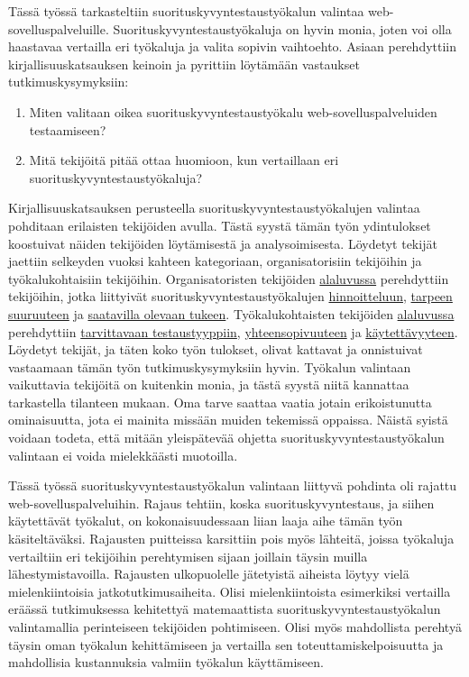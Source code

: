 Tässä työssä tarkasteltiin suorituskyvyntestaustyökalun valintaa web-sovelluspalveluille. Suorituskyvyntestaustyökaluja on hyvin monia, joten voi olla haastavaa vertailla eri työkaluja ja valita sopivin vaihtoehto. Asiaan perehdyttiin kirjallisuuskatsauksen keinoin ja pyrittiin löytämään vastaukset tutkimuskysymyksiin: 

\begin{enumerate}
    \item Miten valitaan oikea suorituskyvyntestaustyökalu web-sovelluspalveluiden testaamiseen?
    \item Mitä tekijöitä pitää ottaa huomioon, kun vertaillaan eri suorituskyvyntestaustyökaluja?
\end{enumerate}

Kirjallisuuskatsauksen perusteella suorituskyvyntestaustyökalujen valintaa pohditaan erilaisten tekijöiden avulla. Tästä syystä tämän työn ydintulokset koostuivat näiden tekijöiden löytämisestä ja analysoimisesta. Löydetyt tekijät jaettiin selkeyden vuoksi kahteen kategoriaan, organisatorisiin tekijöihin ja työkalukohtaisiin tekijöihin. Organisatoristen tekijöiden \hyperref[sec:organisatorisettekijät]{alaluvussa} perehdyttiin tekijöihin, jotka liittyivät suorituskyvyntestaustyökalujen \hyperref[ssec:hinta]{hinnoitteluun}, \hyperref[ssec:tarpeensuuruus]{tarpeen suuruuteen} ja \hyperref[ssec:tuki]{saatavilla olevaan tukeen}. Työkalukohtaisten tekijöiden \hyperref[sec:työkalukohtaisettekijät]{alaluvussa} perehdyttiin \hyperref[ssec:tarvittavatestaustyyppi]{tarvittavaan testaustyyppiin}, \hyperref[ssec:yhteensopivuus]{yhteensopivuuteen} ja \hyperref[ssec:käytettävyys]{käytettävyyteen}. Löydetyt tekijät, ja täten koko työn tulokset, olivat kattavat ja onnistuivat vastaamaan tämän työn tutkimuskysymyksiin hyvin. Työkalun valintaan vaikuttavia tekijöitä on kuitenkin monia, ja tästä syystä niitä kannattaa tarkastella tilanteen mukaan. Oma tarve saattaa vaatia jotain erikoistunutta ominaisuutta, jota ei mainita missään muiden tekemissä oppaissa. Näistä syistä voidaan todeta, että mitään yleispätevää ohjetta suorituskyvyntestaustyökalun valintaan ei voida mielekkäästi muotoilla.

Tässä työssä suorituskyvyntestaustyökalun valintaan liittyvä pohdinta oli rajattu web-so\-vel\-lus\-pal\-ve\-lui\-hin. Rajaus tehtiin, koska suorituskyvyntestaus, ja siihen käytettävät työkalut, on kokonaisuudessaan liian laaja aihe tämän työn käsiteltäväksi. Rajausten puitteissa karsittiin pois myös lähteitä, joissa työkaluja vertailtiin eri tekijöihin perehtymisen sijaan joillain täysin muilla lähestymistavoilla. Rajausten ulkopuolelle jätetyistä aiheista löytyy vielä mielenkiintoisia jatkotutkimusaiheita. Olisi mielenkiintoista esimerkiksi vertailla eräässä tutkimuksessa kehitettyä matemaattista suorituskyvyntestaustyökalun valintamallia perinteiseen tekijöiden pohtimiseen. Olisi myös mahdollista perehtyä täysin oman työkalun kehittämiseen ja vertailla sen toteuttamiskelpoisuutta ja mahdollisia kustannuksia valmiin työkalun käyttämiseen.
